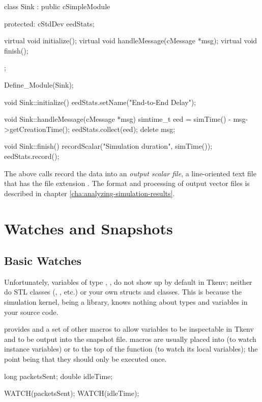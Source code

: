 \begin{cpp}
class Sink : public cSimpleModule
{
  protected:
    cStdDev eedStats;

    virtual void initialize();
    virtual void handleMessage(cMessage *msg);
    virtual void finish();
};

Define_Module(Sink);

void Sink::initialize()
{
    eedStats.setName("End-to-End Delay");
}

void Sink::handleMessage(cMessage *msg)
{
    simtime_t eed = simTime() - msg->getCreationTime();
    eedStats.collect(eed);
    delete msg;
}

void Sink::finish()
{
    recordScalar("Simulation duration", simTime());
    eedStats.record();
}
\end{cpp}

The above calls record the data into an \textit{output scalar file},
a line-oriented text file that has the file extension .
The format and processing of output vector files is described in chapter
\ref{cha:analyzing-simulation-results}.



\section{Watches and Snapshots}

\subsection{Basic Watches}

Unfortunately, variables of type , , 
do not show up by default in Tkenv; neither do STL classes
(, , etc.) or your own structs and
classes. This is because the simulation kernel, being a library, knows
nothing about types and variables in your source code.

{\opp} provides  and a set of other macros to
allow variables to be inspectable in Tkenv and to be output into the snapshot
file.  macros are usually placed into
 (to watch instance variables) or to the top of the
 function (to watch its local variables); the point being
that they should only be executed once.

\begin{cpp}
long packetsSent;
double idleTime;

WATCH(packetsSent);
WATCH(idleTime);
\end{cpp}

